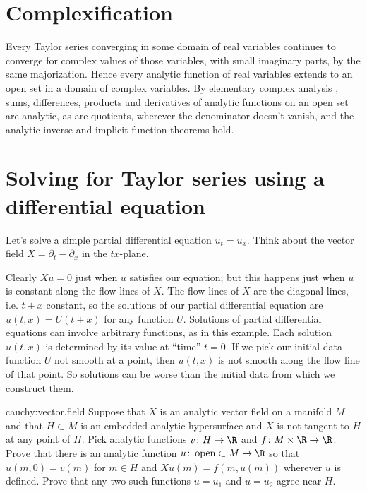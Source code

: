 \section{Complexification}
Every Taylor series converging in some domain of real variables continues to converge for complex values of those variables, with small imaginary parts, by the same majorization.
Hence every analytic function of real variables extends to an open set in a domain of complex variables.
By elementary complex analysis \cite{Ahlfors:1978}, sums, differences, products and derivatives of analytic functions on an open set are analytic, as are quotients, wherever the denominator doesn't vanish, and the analytic inverse and implicit function theorems hold.

\section{Solving for Taylor series using a differential equation}
Let's solve a simple partial differential equation \(u_t = u_x\).
Think about the vector field \(X=\partial_t - \partial_x\) in the \(tx\)-plane.
\begin{center}

\end{center}
Clearly \(Xu=0\) just when \(u\) satisfies our equation; but this happens just when \(u\) is 
constant along the flow lines of \(X\).
The flow lines of \(X\) are the diagonal lines, i.e. \(t+x\) constant, so
the solutions of our partial differential equation are \(u(t,x)=U(t+x)\) for any function \(U\).
Solutions of partial differential equations can involve arbitrary functions, as in this example.
Each solution \(u(t,x)\) is determined by its value at ``time'' \(t=0\).
If we pick our initial data function \(U\) not smooth at a point, then \(u(t,x)\) is not smooth along the flow line of that point.
So solutions can be worse than the initial data from which we construct them.

\begin{problem}{cauchy:vector.field}
Suppose that \(X\) is an analytic vector field on a manifold \(M\) and that \(H \subset M\) is an embedded analytic hypersurface and \(X\) is not tangent to \(H\) at any point of \(H\).
Pick analytic functions \(v \colon H \to \R\) and \(f \colon M \times \R \to \R\).
Prove that there is an analytic function \(u \colon \op{M} \to \R\) so that \(u(m,0)=v(m)\) for \(m \in H\) and \(Xu(m)=f(m,u(m))\) wherever \(u\) is defined.
Prove that any two such functions \(u=u_1\) and \(u=u_2\) agree near \(H\).
\end{problem}

